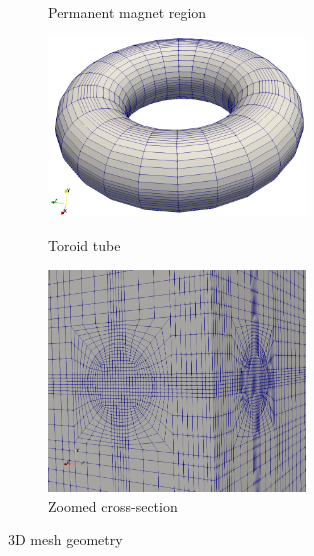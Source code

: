 \documentclass[11pt,a4paper,final]{article}
\begin{document}
\begin{figure}[htb]
\begin{subfigure}[b]{0.29\textwidth}
\caption{Permanent magnet region}
\label{fig:1.3.4}
\end{subfigure}
\begin{subfigure}[b]{0.29\textwidth}
\centering
\includegraphics[width=0.75\textwidth]{3d_mesh_4.png}
\caption{Toroid tube}
\label{fig:1.3.3}
\includegraphics[width=0.75\textwidth]{3d_mesh_6.png}
\caption{Zoomed cross-section}
\label{fig:1.3.5}
\end{subfigure}
\caption{3D mesh geometry}
\label{fig:1.3}
\end{figure}
\end{document}
